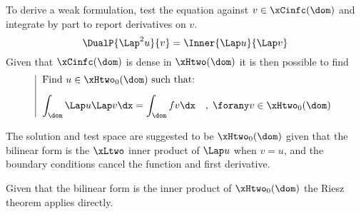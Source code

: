 \begin{tmasltn}{1.3}
\begin{tmatsks}
\item To derive a weak formulation, test the equation against $v \in \xCinfc(\dom)$ and integrate by part to report derivatives on $v$.
\begin{equation*}
\DualP{\Lap^2 u}{v} = \Inner{\Lap u}{\Lap v}
\end{equation*}
Given that $\xCinfc(\dom)$ is dense in $\xHtwo(\dom)$ it is then possible to find 
\begin{equation*}\label{pb:weak_biharmonic}
\left\lvert
\begin{array}{ll}
\mbox{Find $u \in \xHtwo_0(\dom)$ such that:}\\[2ex]
\displaystyle\int_\dom \Lap u \Lap v\dx = \int_\dom f v  \dx\quad,\;\forany  v\in \xHtwo_0(\dom)
\end{array}
\right .
\end{equation*}
\item The solution and test space are suggested to be $\xHtwo_0(\dom)$ given that the bilinear form is the $\xLtwo$ inner product of $\Lap u$ when $v = u$, and the boundary conditions cancel the function and first derivative.
\item Given that the bilinear form is the inner product of $\xHtwo_0(\dom)$ the Riesz theorem applies directly.
\end{tmatsks}
\end{tmasltn}



